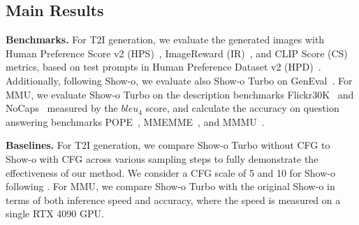 \subsection{Main Results}
\noindent \textbf{Benchmarks.} 
For {T2I generation}, we evaluate the generated images with Human Preference Score v2 (HPS)~\cite{wu2023human}, ImageReward (IR)~\cite{xu2023imagerewardlearningevaluatinghuman}, and CLIP Score (CS)~\cite{hessel2022clipscorereferencefreeevaluationmetric} metrics, based on test prompts in Human Preference Dataset v2 (HPD)~\cite{wu2023human}. 
Additionally, following Show-o, we evaluate also Show-o Turbo on GenEval~\cite{ghosh2023genevalobjectfocusedframeworkevaluating}. 
For {MMU}, we evaluate Show-o Turbo on the description benchmarks Flickr30K~\cite{flickrentitiesijcv,flickr30k} and  NoCaps~\cite{agrawal2019nocaps} measured by the $bleu_4$ score, 
and calculate the accuracy on question answering benchmarks POPE~\cite{li2023evaluating}, MMEMME~\cite{fu2023mme}, and MMMU~\cite{yue2024mmmu}. 

\noindent \textbf{Baselines.} 
For {T2I generation}, we compare Show-o Turbo without CFG to Show-o with CFG across various sampling steps to fully demonstrate the effectiveness of our method. 
We consider a CFG scale of 5 and 10 for Show-o following \cite{xie2024show}. 
For {MMU}, we compare Show-o Turbo with the original Show-o in terms of both inference speed and accuracy, where the speed is measured on a single RTX 4090 GPU.

